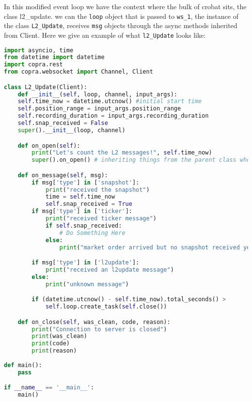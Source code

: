In this modified event loop we have the context where the bulk of crobat sits, the class l2\_update. we can the \texttt{loop} object that is passed to \texttt{ws\_1}, the instance of the class \texttt{L2\_Update}, receives \texttt{msg} objects through the async methods inherited from Client. Here we give an example of what \texttt{l2\_Update} looks like:

\begin{lstlisting}[language=Python]
import asyncio, time
from datetime import datetime
import copra.rest
from copra.websocket import Channel, Client

class L2_Update(Client):
	def __init__(self, loop, channel, input_args):
	self.time_now = datetime.utcnow() #initial start time
	self.position_range = input_args.position_range
	self.recording_duration = input_args.recording_duration
	self.snap_received = False
	super().__init__(loop, channel)

	def on_open(self):
		print("Let's count the L2 messages!", self.time_now)
		super().on_open() # inheriting things from the parent class who really knows    

	def on_message(self, msg):
		if msg['type'] in ['snapshot']:
			print("received the snapshot")
			time = self.time_now
			self.snap_received = True
		if msg['type'] in ['ticker']:
			print("received ticker message")
			if self.snap_received:
				# Do Something Here
			else:
				print("market order arrived but no snapshot received yet")

		if msg['type'] in ['l2update']:
			print("received an l2update message")
		else:
			print("unknown message")

		if (datetime.utcnow() - self.time_now).total_seconds() > 		self.recording_duration:
			self.loop.create_task(self.close()) 

	def on_close(self, was_clean, code, reason):
		print("Connection to server is closed")
		print(was_clean)
		print(code)
		print(reason)
		
def main():
	pass

if __name__ == '__main__':
	main()
\end{lstlisting}